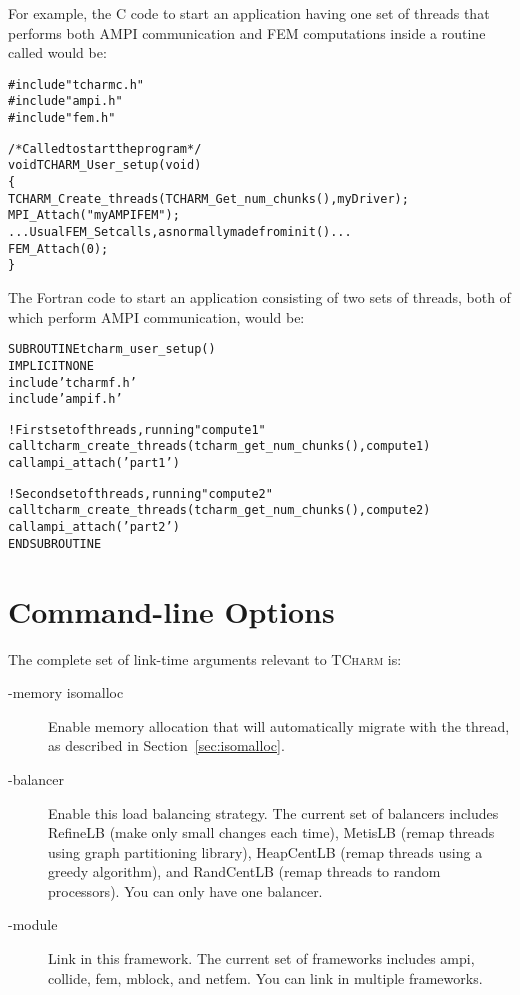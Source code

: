 \documentclass[10pt]{article}
\newcommand{\tcharm}{\textsc{TCharm}}
\begin{document}
For example, the C code to start an application having one set of threads
that performs both AMPI communication and FEM computations inside a 
routine called  would be:

\begin{alltt}
     #include "tcharmc.h"
     #include "ampi.h"
     #include "fem.h"
     
     /* Called to start the program */
     void TCHARM\_User\_setup(void)
     \{
         TCHARM\_Create\_threads(TCHARM\_Get\_num\_chunks(),myDriver);
         MPI\_Attach("myAMPIFEM");        
         ... Usual FEM_Set calls, as normally made from init() ...
         FEM\_Attach(0);
     \}
\end{alltt}

The Fortran code to start an application consisting of two sets of threads,
both of which perform AMPI communication, would be:

\begin{alltt}
     SUBROUTINE tcharm\_user\_setup()
       IMPLICIT NONE
       include 'tcharmf.h'
       include 'ampif.h'
       
    ! First set of threads, running "compute1"
       call tcharm\_create\_threads(tcharm\_get\_num\_chunks(),compute1)
       call ampi\_attach('part1')
       
    ! Second set of threads, running "compute2"
       call tcharm\_create\_threads(tcharm\_get\_num\_chunks(),compute2)
       call ampi\_attach('part2')
     END SUBROUTINE
\end{alltt}



\section{Command-line Options}
\label{sec:cla}

The complete set of link-time arguments relevant to \tcharm{} is:
\begin{description}
\item[-memory isomalloc] Enable memory allocation that will automatically
migrate with the thread, as described in Section~\ref{sec:isomalloc}.

\item[-balancer ] Enable this load balancing strategy.  The
current set of balancers  includes RefineLB (make only small changes
each time), MetisLB (remap threads using graph partitioning library), 
HeapCentLB (remap threads using a greedy algorithm), and RandCentLB
(remap threads to random processors).  You can only have one balancer.

\item[-module ] Link in this framework.  The current set of frameworks
 includes ampi, collide, fem, mblock, and netfem.  You can link in 
multiple frameworks.

\end{description}
\end{document}
